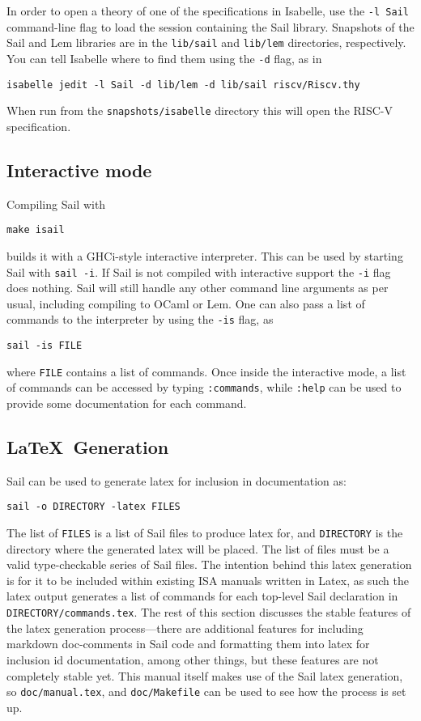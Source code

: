In order to open a theory of one of the specifications in Isabelle,
use the \verb+-l Sail+ command-line flag to load the session containing the
Sail library. Snapshots of the Sail and Lem libraries are in the
\verb+lib/sail+ and \verb+lib/lem+ directories, respectively. You can
tell Isabelle where to find them using the \verb+-d+ flag, as in
\begin{verbatim}
isabelle jedit -l Sail -d lib/lem -d lib/sail riscv/Riscv.thy
\end{verbatim}
When run from the \verb+snapshots/isabelle+ directory this will open
the RISC-V specification.

\subsection{Interactive mode}

Compiling Sail with
\begin{verbatim}
make isail
\end{verbatim}
builds it with a GHCi-style interactive interpreter. This can be used
by starting Sail with \verb+sail -i+. If Sail is not compiled with
interactive support the \verb+-i+ flag does nothing. Sail will still
handle any other command line arguments as per usual, including
compiling to OCaml or Lem. One can also pass a list of commands to the
interpreter by using the \verb+-is+ flag, as
\begin{verbatim}
sail -is FILE
\end{verbatim}
where \verb+FILE+ contains a list of commands. Once inside the interactive
mode, a list of commands can be accessed by typing \verb+:commands+,
while \verb+:help+ can be used to provide some documentation for each
command.

\subsection{\LaTeX\ Generation}

Sail can be used to generate latex for inclusion in documentation as:
\begin{verbatim}
sail -o DIRECTORY -latex FILES
\end{verbatim}
The list of \verb+FILES+ is a list of Sail files to produce latex for,
and \verb+DIRECTORY+ is the directory where the generated latex will
be placed. The list of files must be a valid type-checkable series of
Sail files. The intention behind this latex generation is for it to be
included within existing ISA manuals written in Latex, as such the
latex output generates a list of commands for each top-level Sail
declaration in \verb+DIRECTORY/commands.tex+. The rest of this section
discusses the stable features of the latex generation process---there
are additional features for including markdown doc-comments in Sail
code and formatting them into latex for inclusion id documentation,
among other things, but these features are not completely stable
yet. This manual itself makes use of the Sail latex generation, so
\verb+doc/manual.tex+, and \verb+doc/Makefile+ can be used to see how
the process is set up.


